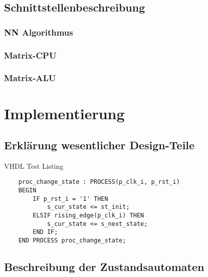 \documentclass
[ 12pt,
  parskip=half %
]{scrreprt}
\newenvironment{mylisting}[1][H]
{\captionsetup{aboveskip=-0.2\normalbaselineskip}\begin{listing}[#1]}
{\end{listing}}
\begin{document}




\section{Schnittstellenbeschreibung}

\subsection{NN Algorithmus}

\subsection{Matrix-CPU}

\subsection{Matrix-ALU}


\chapter{Implementierung}

\section{Erklärung wesentlicher Design-Teile}

\begin{mylisting}
	\caption{VHDL Test Listing}
	\label{listing:vhdl-test}
	\begin{verbatim}
	proc_change_state : PROCESS(p_clk_i, p_rst_i)
	BEGIN
		IF p_rst_i = '1' THEN 
			s_cur_state <= st_init;
		ELSIF rising_edge(p_clk_i) THEN
			s_cur_state <= s_next_state;
		END IF;
	END PROCESS proc_change_state;
	\end{verbatim}
\end{mylisting} 

\section{Beschreibung der Zustandsautomaten}
\end{document}
